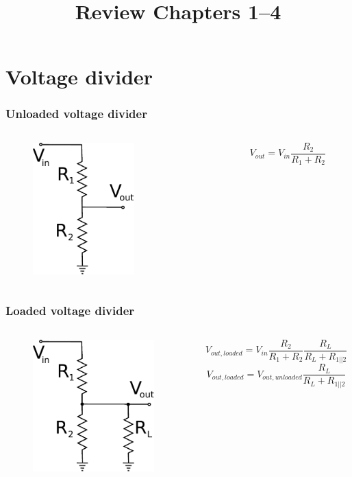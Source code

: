 \documentclass[beamer]{standalone}
\begin{document}
\title[Electronics 1]{Review Chapters 1--4}

\begin{frame} 
  \titlepage
\end{frame}

\section{Voltage divider}
\begin{frame}
 \frametitle{Unloaded voltage divider}
 \begin{columns}[c]
  \begin{column}{.3\textwidth}
   \begin{figure}
    \includegraphics[height=2in]{./pics/unloaded_voltage_divider}
   \end{figure}
  \end{column}
  \begin{column}{.7\textwidth}
   \[ V_{out} = V_{in} \frac{R_2}{R_1+R_2} \]
  \end{column}
 \end{columns}
\end{frame}

\begin{frame}
 \frametitle{Loaded voltage divider}
 \begin{columns}[c]
  \begin{column}{.3\textwidth}
   \begin{figure}
    \includegraphics[height=2in]{./pics/loaded_voltage_divider}
   \end{figure}
  \end{column}
  \begin{column}{.7\textwidth}
   \[ V_{out,loaded} = V_{in} \frac{R_2}{R_1+R_2} \frac{R_L}{R_L + R_{1||2}} \]
   \[ V_{out,loaded} = V_{out,unloaded} \frac{R_L}{R_L + R_{1||2}} \]
  \end{column}
 \end{columns}
\end{frame}
\end{document}
